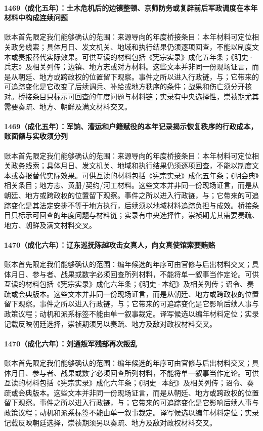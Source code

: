 \paragraph{1469（成化五年）：土木危机后的边镇整顿、京师防务或复辟前后军政调度在本年材料中构成连续问题} 账本首先限定我们能够确认的范围：来源导向的年度桥接条目：本年材料可定位相关政务线索；具体月日、发文机关、地域和执行结果仍须逐项回查，不能以制度文本或奏报替代实际效果。可供互读的材料包括《宪宗实录》成化五年条；《明史·兵志》及相关列传；边镇、地方志或对方材料。这些文本并非同一份现场证言，而是从朝廷、地方或跨政权的位置留下观察。事件之所以进入行政链，与；它带来的可追踪变化是它改变了后续调兵、补给或地方秩序的条件；战果和伤亡须分开核对。桥接条目只标示可回查的年度问题与材料链；实录有中央选择性，崇祯期尤其需要奏疏、地方、朝鲜及满文材料交叉。

\paragraph{1469（成化五年）：军饷、漕运和户籍赋役的本年记录揭示恢复秩序的行政成本，账面额与实收须分列} 账本首先限定我们能够确认的范围：来源导向的年度桥接条目：本年材料可定位相关政务线索；具体月日、发文机关、地域和执行结果仍须逐项回查，不能以制度文本或奏报替代实际效果。可供互读的材料包括《宪宗实录》成化五年条；《明会典》相关条目；地方志、黄册/契约/河工材料。这些文本并非同一份现场证言，而是从朝廷、地方或跨政权的位置留下观察。事件之所以进入行政链，与；它带来的可追踪变化是其法定安排不等于地方执行，后续须以地域材料追踪负担与成效。桥接条目只标示可回查的年度问题与材料链；实录有中央选择性，崇祯期尤其需要奏疏、地方、朝鲜及满文材料交叉。

\paragraph{1470（成化六年）：辽东巡抚陈越攻击女真人，向女真使馆索要贿赂} 账本首先限定我们能够确认的范围：编年候选的年序可由官修与后出材料交叉；具体月日、参与者、战果或数字必须回查所列材料，不能将单一叙事当作定论。可供互读的材料包括《宪宗实录》成化六年条；《明史·本纪》及相关列传；诏令、奏疏或会典版本。这些文本并非同一份现场证言，而是从朝廷、地方或跨政权的位置留下观察。事件之所以进入行政链，与；它带来的可追踪变化是它影响后续人事与政策议程；动机和派系标签不能由单一叙事裁定。译写候选以编年材料定位；实录记载反映朝廷选择，崇祯期须另以奏疏、地方及敌对政权材料交叉。

\paragraph{1470（成化六年）：刘通叛军残部再次叛乱} 账本首先限定我们能够确认的范围：编年候选的年序可由官修与后出材料交叉；具体月日、参与者、战果或数字必须回查所列材料，不能将单一叙事当作定论。可供互读的材料包括《宪宗实录》成化六年条；《明史·本纪》及相关列传；诏令、奏疏或会典版本。这些文本并非同一份现场证言，而是从朝廷、地方或跨政权的位置留下观察。事件之所以进入行政链，与；它带来的可追踪变化是它影响后续人事与政策议程；动机和派系标签不能由单一叙事裁定。译写候选以编年材料定位；实录记载反映朝廷选择，崇祯期须另以奏疏、地方及敌对政权材料交叉。
